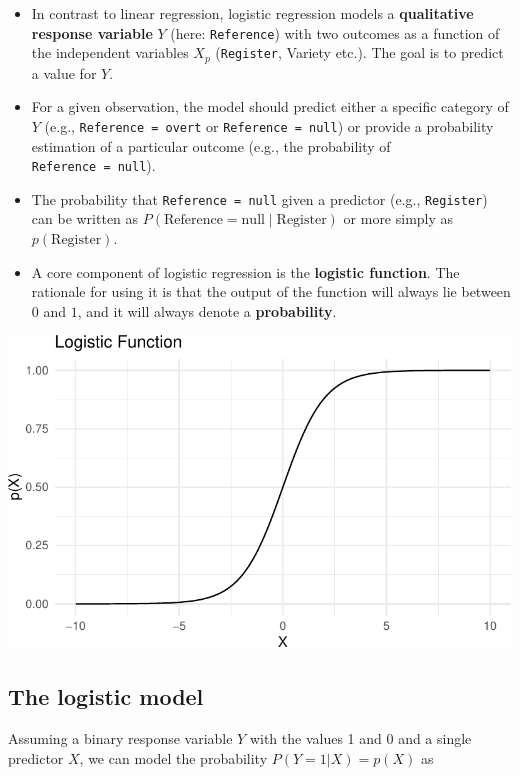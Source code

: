 \documentclass[
  11pt,
  letterpaper,
  DIV=11,
  numbers=noendperiod]{scrreprt}
\begin{document}
\begin{itemize}
\item
  In contrast to linear regression, logistic regression models a
  \textbf{qualitative response variable} \(Y\) (here:
  \texttt{Reference}) with two outcomes as a function of the independent
  variables \(X_p\) (\texttt{Register}, Variety etc.). The goal is to
  predict a value for \(Y\).
\item
  For a given observation, the model should predict either a specific
  category of \(Y\) (e.g., \texttt{Reference\ =\ overt} or
  \texttt{Reference\ =\ null}) or provide a probability estimation of a
  particular outcome (e.g., the probability of
  \texttt{Reference\ =\ null}).
\item
  The probability that \texttt{Reference\ =\ null} given a predictor
  (e.g., \texttt{Register}) can be written as
  \(P(\text{Reference} = \text{null} \mid \text{Register})\) or more
  simply as \(p(\text{Register})\).
\item
  A core component of logistic regression is the \textbf{logistic
  function}. The rationale for using it is that the output of the
  function will always lie between \(0\) and \(1\), and it will always
  denote a \textbf{probability}.
\end{itemize}

\includegraphics{Logistic_regression_files/figure-pdf/unnamed-chunk-5-1.pdf}

\subsection{The logistic model}\label{the-logistic-model}

Assuming a binary response variable \(Y\) with the values 1 and 0 and a
single predictor \(X\), we can model the probability
\(P(Y = 1\vert X) = p(X)\) as
\end{document}
